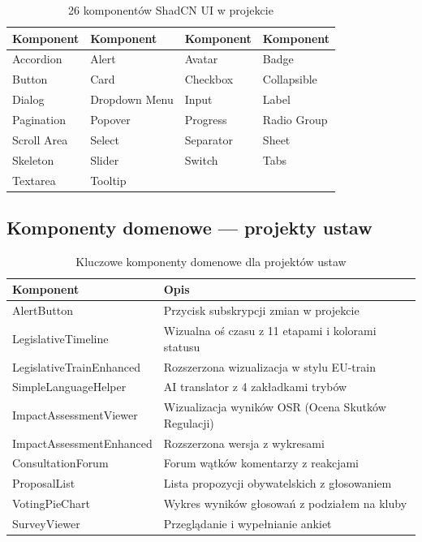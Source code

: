 \documentclass[12pt,a4paper]{article}
\begin{document}
\begin{table}[H]
\centering
\renewcommand{\arraystretch}{1.2}
\footnotesize
\begin{tabularx}{\textwidth}{X X X X}
\toprule
\textbf{Komponent} & \textbf{Komponent} & \textbf{Komponent} & \textbf{Komponent} \\
\midrule
Accordion & Alert & Avatar & Badge \\
Button & Card & Checkbox & Collapsible \\
Dialog & Dropdown Menu & Input & Label \\
Pagination & Popover & Progress & Radio Group \\
Scroll Area & Select & Separator & Sheet \\
Skeleton & Slider & Switch & Tabs \\
Textarea & Tooltip & & \\
\bottomrule
\end{tabularx}
\caption{26 komponentów ShadCN UI w projekcie}
\end{table}

\subsection{Komponenty domenowe — projekty ustaw}

\begin{table}[H]
\centering
\renewcommand{\arraystretch}{1.3}
\footnotesize
\begin{tabularx}{\textwidth}{l X}
\toprule
\textbf{Komponent} & \textbf{Opis} \\
\midrule
AlertButton & Przycisk subskrypcji zmian w projekcie \\
LegislativeTimeline & Wizualna oś czasu z 11 etapami i kolorami statusu \\
LegislativeTrainEnhanced & Rozszerzona wizualizacja w stylu EU-train \\
SimpleLanguageHelper & AI translator z 4 zakładkami trybów \\
ImpactAssessmentViewer & Wizualizacja wyników OSR (Ocena Skutków Regulacji) \\
ImpactAssessmentEnhanced & Rozszerzona wersja z wykresami \\
ConsultationForum & Forum wątków komentarzy z reakcjami \\
ProposalList & Lista propozycji obywatelskich z głosowaniem \\
VotingPieChart & Wykres wyników głosowań z podziałem na kluby \\
SurveyViewer & Przeglądanie i wypełnianie ankiet \\
\bottomrule
\end{tabularx}
\caption{Kluczowe komponenty domenowe dla projektów ustaw}
\end{table}
\end{document}
